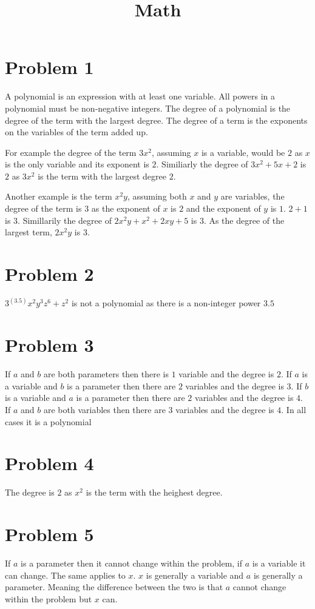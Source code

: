 \documentclass[12pt, letterpaper, twoside]{article}
\title{Math}
\begin{document}
	
	\maketitle
\section{Problem 1}
A polynomial is an expression with at least one variable. All powers in a polynomial must be non-negative integers. The degree of a polynomial is the degree of the term with the largest degree. The degree of a term is the exponents on the variables of the term added up.\par
For example the degree of the term $3x^2$, assuming $x$ is a variable, would be $2$ as $x$ is the only variable and its exponent is $2$. Similiarly the degree of $3x^2 + 5x +2$ is $2$ as $3x^2$ is the term with the largest degree $2$. \par
Another example is the term $x^2y$, assuming both $x$ and $y$ are variables, the degree of the term is $3$ as the exponent of $x$ is $2$ and the exponent of $y$ is $1$. $2 + 1$ is $3$. Simillarily the degree of $2x^2y + x^2 + 2xy + 5$ is $3$. As the degree of the largest term, $2x^2y$ is $3$. 
\section{Problem 2}
$3^(3.5)x^2y^3z^6 + z^2$ is not a polynomial as there is a non-integer power $3.5$
\section{Problem 3}
If $a$ and $b$ are both parameters then there is $1$ variable and the degree is $2$. If $a$ is a variable and $b$ is a parameter then there are $2$ variables and the degree is $3$. If $b$ is a variable and $a$ is a parameter then there are $2$ variables and the degree is $4$. If $a$ and $b$ are both variables then there are $3$ variables and the degree is $4$. In all cases it is a polynomial
\section{Problem 4}
The degree is $2$ as $x^2$ is the term with the heighest degree.
\section{Problem 5}
If $a$ is a parameter then it cannot change within the problem, if $a$ is a variable it can change. The same applies to $x$. $x$ is generally a variable and $a$ is generally a parameter. Meaning the difference between the two is that $a$ cannot change within the problem but $x$ can.	
\end{document}
